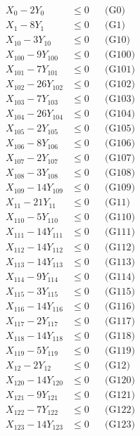 \documentclass[a4paper,10pt]{article}
\begin{document}
\allowdisplaybreaks
{\small\begin{align}
X_{0} - 2Y_{0} &\leq 0 && \text{(G0)} \\
X_{1} - 8Y_{1} &\leq 0 && \text{(G1)} \\
X_{10} - 3Y_{10} &\leq 0 && \text{(G10)} \\
X_{100} - 9Y_{100} &\leq 0 && \text{(G100)} \\
X_{101} - 7Y_{101} &\leq 0 && \text{(G101)} \\
X_{102} - 26Y_{102} &\leq 0 && \text{(G102)} \\
X_{103} - 7Y_{103} &\leq 0 && \text{(G103)} \\
X_{104} - 26Y_{104} &\leq 0 && \text{(G104)} \\
X_{105} - 2Y_{105} &\leq 0 && \text{(G105)} \\
X_{106} - 8Y_{106} &\leq 0 && \text{(G106)} \\
X_{107} - 2Y_{107} &\leq 0 && \text{(G107)} \\
X_{108} - 3Y_{108} &\leq 0 && \text{(G108)} \\
X_{109} - 14Y_{109} &\leq 0 && \text{(G109)} \\
X_{11} - 21Y_{11} &\leq 0 && \text{(G11)} \\
X_{110} - 5Y_{110} &\leq 0 && \text{(G110)} \\
X_{111} - 14Y_{111} &\leq 0 && \text{(G111)} \\
X_{112} - 14Y_{112} &\leq 0 && \text{(G112)} \\
X_{113} - 14Y_{113} &\leq 0 && \text{(G113)} \\
X_{114} - 9Y_{114} &\leq 0 && \text{(G114)} \\
X_{115} - 3Y_{115} &\leq 0 && \text{(G115)} \\
\allowbreak
X_{116} - 14Y_{116} &\leq 0 && \text{(G116)} \\
X_{117} - 2Y_{117} &\leq 0 && \text{(G117)} \\
X_{118} - 14Y_{118} &\leq 0 && \text{(G118)} \\
X_{119} - 5Y_{119} &\leq 0 && \text{(G119)} \\
X_{12} - 2Y_{12} &\leq 0 && \text{(G12)} \\
X_{120} - 14Y_{120} &\leq 0 && \text{(G120)} \\
X_{121} - 9Y_{121} &\leq 0 && \text{(G121)} \\
X_{122} - 7Y_{122} &\leq 0 && \text{(G122)} \\
X_{123} - 14Y_{123} &\leq 0 && \text{(G123)} \\

\end{align}}
\end{document}
